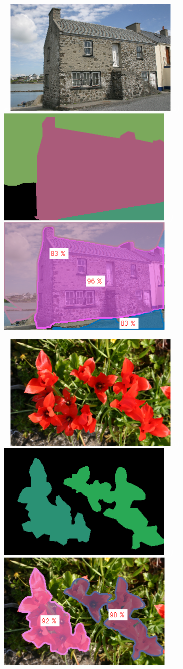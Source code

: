 \begin{figure}[!ht]
  \centering
{\footnotesize\textit{\textcolor{white}{a)}}}\includegraphics[width=0.31\linewidth]{figs/3_5_s_00.png}
{\footnotesize\textit{\textcolor{white}{a)}}}\includegraphics[width=0.31\linewidth]{figs/3_5_s_gt.png}
{\footnotesize\textit{\textcolor{white}{a)}}}\includegraphics[width=0.31\linewidth]{figs/3_5_s_mvf.png}



{\footnotesize\textit{\textcolor{white}{a)}}}\includegraphics[width=0.31\linewidth]{figs/10_7_s_00.png}
{\footnotesize\textit{\textcolor{white}{a)}}}\includegraphics[width=0.31\linewidth]{figs/10_7_s_gt.png}
{\footnotesize\textit{\textcolor{white}{a)}}}\includegraphics[width=0.31\linewidth]{figs/10_7_s_mvf.png}


\end{figure}
